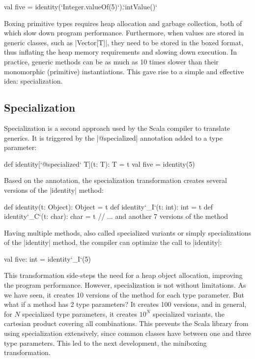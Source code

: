 \begin{lstlisting-nobreak}
 val five = identity(`Integer.valueOf(5)`).`intValue()`
\end{lstlisting-nobreak}

Boxing primitive types requires heap allocation and garbage collection, both of which slow down program performance. Furthermore, when values are stored in generic classes, such as |Vector[T]|, they need to be stored in the boxed format, thus inflating the heap memory requirements and slowing down execution. In practice, generic methods can be as much as 10 times slower than their monomorphic (primitive) instantiations. This gave rise to a simple and effective idea: specialization.

\subsection{Specialization}

Specialization is a second approach used by the Scala compiler to translate generics. It is triggered by the |@specialized| annotation added to a type parameter:

\begin{lstlisting-nobreak}
 def identity[`@specialized` T](t: T): T = t
 val five = identity(5)
\end{lstlisting-nobreak}

Based on the annotation, the specialization transformation creates several versions of the |identity| method:

\begin{lstlisting-nobreak}
 def identity(t: Object): Object = t
 def identity`_I`(t: int): int = t
 def identity`_C`(t: char): char = t
 // ... and another 7 versions of the method
\end{lstlisting-nobreak}

Having multiple methods, also called specialized variants or simply specializations of the |identity| method, the compiler can optimize the call to |identity|:

\begin{lstlisting-nobreak}
 val five: int = identity`_I`(5)
\end{lstlisting-nobreak}

This transformation side-steps the need for a heap object allocation, improving the program performance.
However, specialization is not without limitations. As we have seen, it creates 10 versions of the method for each type parameter. But what if a method has 2 type parameters? It creates 100 versions, and in general, for $N$ specialized type parameters, it creates $10^N$ specialized variants, the cartesian product covering all combinations. This prevents the Scala library from using specialization extensively, since common classes have between one and three type parameters. This led to the next development, the miniboxing transformation.

